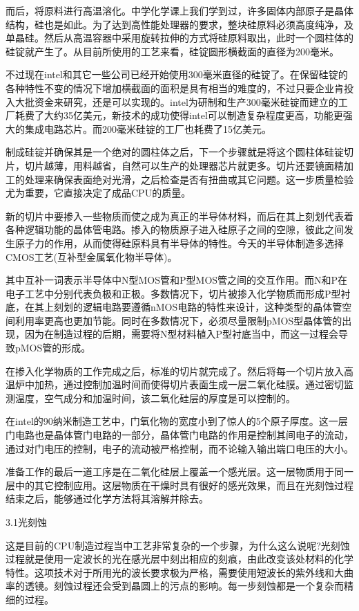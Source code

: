 \documentclass[utf8]{book}
\begin{document}
	而后，将原料进行高温溶化。中学化学课上我们学到过，许多固体内部原子是晶体结构，硅也是如此。为了达到高性能处理器的要求，整块硅原料必须高度纯净，及单晶硅。然后从高温容器中采用旋转拉伸的方式将硅原料取出，此时一个圆柱体的硅锭就产生了。从目前所使用的工艺来看，硅锭圆形横截面的直径为200毫米。
	
	不过现在intel和其它一些公司已经开始使用300毫米直径的硅锭了。在保留硅锭的各种特性不变的情况下增加横截面的面积是具有相当的难度的，不过只要企业肯投入大批资金来研究，还是可以实现的。intel为研制和生产300毫米硅锭而建立的工厂耗费了大约35亿美元，新技术的成功使得intel可以制造复杂程度更高，功能更强大的集成电路芯片。而200毫米硅锭的工厂也耗费了15亿美元。
	
	制成硅锭并确保其是一个绝对的圆柱体之后，下一个步骤就是将这个圆柱体硅锭切片，切片越薄，用料越省，自然可以生产的处理器芯片就更多。切片还要镜面精加工的处理来确保表面绝对光滑，之后检查是否有扭曲或其它问题。这一步质量检验尤为重要，它直接决定了成品CPU的质量。
	
	新的切片中要掺入一些物质而使之成为真正的半导体材料，而后在其上刻划代表着各种逻辑功能的晶体管电路。掺入的物质原子进入硅原子之间的空隙，彼此之间发生原子力的作用，从而使得硅原料具有半导体的特性。今天的半导体制造多选择CMOS工艺(互补型金属氧化物半导体)。
	
	其中互补一词表示半导体中N型MOS管和P型MOS管之间的交互作用。而N和P在电子工艺中分别代表负极和正极。多数情况下，切片被掺入化学物质而形成P型衬底，在其上刻划的逻辑电路要遵循nMOS电路的特性来设计，这种类型的晶体管空间利用率更高也更加节能。同时在多数情况下，必须尽量限制pMOS型晶体管的出现，因为在制造过程的后期，需要将N型材料植入P型衬底当中，而这一过程会导致pMOS管的形成。
	
	在掺入化学物质的工作完成之后，标准的切片就完成了。然后将每一个切片放入高温炉中加热，通过控制加温时间而使得切片表面生成一层二氧化硅膜。通过密切监测温度，空气成分和加温时间，该二氧化硅层的厚度是可以控制的。
	
	在intel的90纳米制造工艺中，门氧化物的宽度小到了惊人的5个原子厚度。这一层门电路也是晶体管门电路的一部分，晶体管门电路的作用是控制其间电子的流动，通过对门电压的控制，电子的流动被严格控制，而不论输入输出端口电压的大小。
	
	准备工作的最后一道工序是在二氧化硅层上覆盖一个感光层。这一层物质用于同一层中的其它控制应用。这层物质在干燥时具有很好的感光效果，而且在光刻蚀过程结束之后，能够通过化学方法将其溶解并除去。
	
	3.1光刻蚀
	
	这是目前的CPU制造过程当中工艺非常复杂的一个步骤，为什么这么说呢?光刻蚀过程就是使用一定波长的光在感光层中刻出相应的刻痕，由此改变该处材料的化学特性。这项技术对于所用光的波长要求极为严格，需要使用短波长的紫外线和大曲率的透镜。刻蚀过程还会受到晶圆上的污点的影响。每一步刻蚀都是一个复杂而精细的过程。
	
\end{document}

